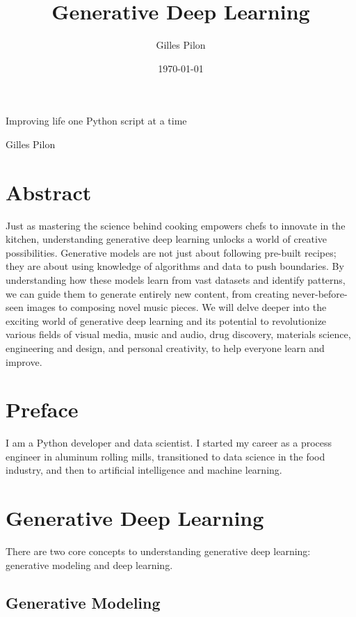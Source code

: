 \documentclass[10pt, letterpaper, twoside]{article}
\title{Generative Deep Learning}
\author{Gilles Pilon}
\date{\today}
\begin{document}
\maketitle
\renewcommand{\epigraphflush}{flushleft}
\renewcommand{\textflush}{flushleft}
\renewcommand{\sourceflush}{flushleft}
\epigraph{Improving life one Python script at a time}{Gilles Pilon}
\newpage
\tableofcontents
\newpage

\section{Abstract}\label{sec:abstract}
Just as mastering the science behind cooking empowers chefs to innovate in the kitchen, understanding generative deep learning unlocks a world of creative possibilities. Generative models are not just about following pre-built recipes; they are about using knowledge of algorithms and data to push boundaries. By understanding how these models learn from vast datasets and identify patterns, we can guide them to generate entirely new content, from creating never-before-seen images to composing novel music pieces. We will delve deeper into the exciting world of generative deep learning and its potential to revolutionize various fields of visual media, music and audio, drug discovery, materials science, engineering and design, and personal creativity, to help everyone learn and improve.

\section{Preface}
I am a Python developer and data scientist. I started my career as a process engineer in aluminum rolling mills, transitioned to data science in the food industry, and then to artificial intelligence and machine learning.

\section{Generative Deep Learning}\label{sec:generative_deep_learning}
There are two core concepts to understanding generative deep learning: generative modeling and deep learning.

\subsection{Generative Modeling}\label{sec:generative_modeling}
\end{document}

